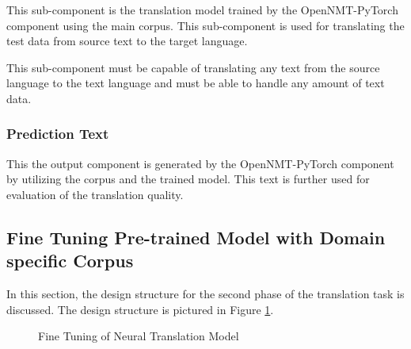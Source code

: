 This sub-component is the translation model trained by the OpenNMT-PyTorch component using the main corpus. This sub-component is used for translating the test data from source text to the target language. 

This sub-component must be capable of translating any text from the source language to the text language and must be able to handle any amount of text data.  

\subsubsection{Prediction Text}

This the output component is generated by the OpenNMT-PyTorch component by utilizing the corpus and the trained model. This text is further used for evaluation of the translation quality.

\subsection{Fine Tuning Pre-trained Model with Domain specific Corpus}
In this section, the design structure for the second phase of the translation task is discussed. The design structure is pictured in Figure \ref{seq2seq2}.

\begin{figure}[h]
\caption{Fine Tuning of Neural Translation Model} \label{seq2seq2}
\end{figure}


